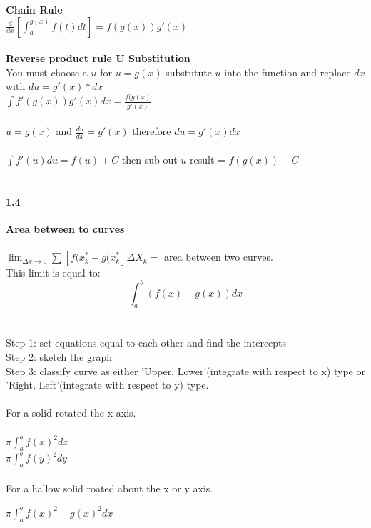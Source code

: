 \documentclass[14pt]{extreport}
\begin{document}
\textbf{Chain Rule}\\
$\frac{d}{dx}[\int_{a}^{g(x)} f(t)dt] = f(g(x))g'(x)$\\\\

\textbf{Reverse product rule U Substitution}\\
You must choose a $u$ for $u=g(x)$ substutute $u$ into the function and replace $dx$ with $du=g'(x)*dx$\\$\int f'(g(x))g'(x)dx = \frac{f(g(x)}{g'(x)}$\\\\
$u = g(x)$ and $\frac{du}{dx}=g'(x)$ therefore $du = g'(x)dx$\\\\
$\int f'(u)du = f(u)+C$ then sub out $u$ result = $f(g(x)) + C$\\\\


\paragraph{1.4} \textbf{Area between to curves}\\\\

$\lim_{\Delta x \to 0} \sum [f(x_{k}^{*} - g(x_{k}^{*}] \Delta X_k=$ area between two curves.\\
This limit is equal to: $$  \int_{a}^{b} (f(x) - g(x))dx$$\\\\

Step 1: set equations equal to each other and find the intercepts\\
Step 2: sketch the graph\\
Step 3: classify curve as either 'Upper, Lower'(integrate with respect to x) type or 'Right, Left'(integrate with respect to y) type.\\\\

For a solid rotated the x axis.\\\\
$\pi \int_{a}^{b} f(x)^2dx$\\

$\pi \int_{a}^{b} f(y)^2dy$\\\\

For a hallow solid roated about the x or y axis.

$\pi \int_{a}^{b} f(x)^2 -g(x)^2dx$\\\\
\end{document}
